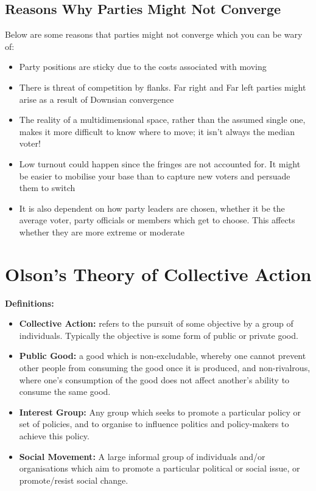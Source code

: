 \documentclass[12pt, letterpaper]{article}
\begin{document}
\subsection{Reasons Why Parties Might Not Converge}
Below are some reasons that parties might not converge which you can be wary of:
\begin{itemize}
	\item Party positions are sticky due to the costs associated with moving
	\item There is threat of competition by flanks. Far right and Far left parties might arise as a result of Downsian convergence
	\item The reality of a multidimensional space, rather than the assumed single one, makes it more difficult to know where to move; it isn't always the median voter!
	\item Low turnout could happen since the fringes are not accounted for. It might be easier to mobilise your base than to capture new voters and persuade them to switch
	\item It is also dependent on how party leaders are chosen, whether it be the average voter, party officials or members which get to choose. This affects whether they are more extreme or moderate
 
\end{itemize}


\newpage
\section{Olson's Theory of Collective Action}
\textbf{Definitions:} 
\begin{itemize}	
	\item \textbf{Collective Action:} refers to the pursuit of some objective by a group of individuals. Typically the objective is some form of public or private good.
	\item \textbf{Public Good:} a good which is non-excludable, whereby one cannot prevent other people from consuming the good once it is produced, and non-rivalrous, where one's consumption of the good does not affect another's ability to consume the same good.
	\item \textbf{Interest Group:} Any group which seeks to promote a particular policy or set of policies, and to organise to influence politics and policy-makers to achieve this policy.
	\item \textbf{Social Movement:} A large informal group of individuals and/or organisations which aim to promote a particular political or social issue, or promote/resist social change.

\end{itemize}
\end{document}
